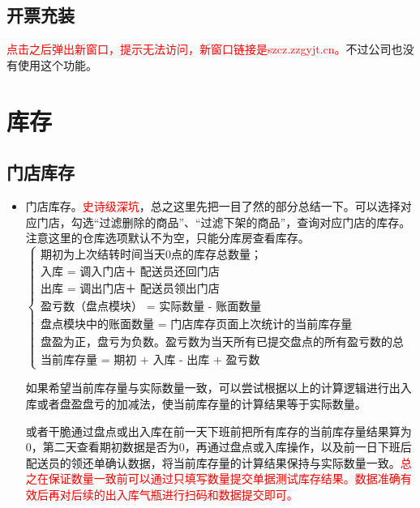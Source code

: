 \documentclass[UTF8]{ctexart}
\begin{document}
\subsection{开票充装}

\textcolor{red}{点击之后弹出新窗口，提示无法访问，新窗口链接是szcz.zzgyjt.cn。}不过公司也没有使用这个功能。

\section{库存}



\subsection{门店库存}
	\begin{itemize}
	
	\item 门店库存。\textcolor{red}{史诗级深坑}，总之这里先把一目了然的部分总结一下。可以选择对应门店，勾选“过滤删除的商品”、“过滤下架的商品”，查询对应门店的库存。注意这里的仓库选项默认不为空，只能分库房查看库存。
$$	
\begin{cases}
	\text{期初为上次结转时间当天0点的库存总数量；} \\
	
	\text{入库 = 调入门店＋ 配送员还回门店 } \\
	
	\text{出库 = 调出门店＋ 配送员领出门店  } \\
	
	\text{盈亏数（盘点模块） = 实际数量 - 账面数量  } \\
	
	\text{盘点模块中的账面数量 = 门店库存页面上次统计的当前库存量} \\
	
	\text{盘盈为正，盘亏为负数。盈亏数为当天所有已提交盘点的所有盈亏数的总和。  } \\
	
	\text{当前库存量 = 期初 + 入库 - 出库 + 盈亏数  } 	
\end{cases}
$$
	
	如果希望当前库存量与实际数量一致，可以尝试根据以上的计算逻辑进行出入库或者盘盈盘亏的加减法，使当前库存量的计算结果等于实际数量。
	
	或者干脆通过盘点或出入库在前一天下班前把所有库存的当前库存量结果算为0，第二天查看期初数据是否为0，再通过盘点或入库操作，以及前一日下班后配送员的领还单确认数据，将当前库存量的计算结果保持与实际数量一致。\textcolor{red}{总之在保证数量一致前可以通过只填写数量提交单据测试库存结果。数据准确有效后再对后续的出入库气瓶进行扫码和数据提交即可。}
	

\end{itemize}
\end{document}
